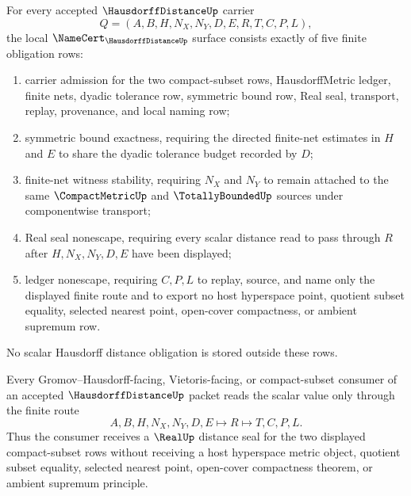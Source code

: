 \begin{theorem}
\label{thm:hausdorff-distance-namecert-obligations}
For every accepted $\HausdorffDistanceUp$ carrier
$$
Q=(A,B,H,N_X,N_Y,D,E,R,T,C,P,L),
$$
the local $\NameCert_{\HausdorffDistanceUp}$ surface consists exactly of five finite obligation rows:
\begin{enumerate}
\item carrier admission for the two compact-subset rows, HausdorffMetric ledger, finite nets, dyadic tolerance row, symmetric bound row, Real seal, transport, replay, provenance, and local naming row;
\item symmetric bound exactness, requiring the directed finite-net estimates in $H$ and $E$ to share the dyadic tolerance budget recorded by $D$;
\item finite-net witness stability, requiring $N_X$ and $N_Y$ to remain attached to the same $\CompactMetricUp$ and $\TotallyBoundedUp$ sources under componentwise transport;
\item Real seal nonescape, requiring every scalar distance read to pass through $R$ after $H,N_X,N_Y,D,E$ have been displayed;
\item ledger nonescape, requiring $C,P,L$ to replay, source, and name only the displayed finite route and to export no host hyperspace point, quotient subset equality, selected nearest point, open-cover compactness, or ambient supremum row.
\end{enumerate}
No scalar Hausdorff distance obligation is stored outside these rows.
\end{theorem}

\begin{theorem}
\label{thm:hausdorff-distance-scalar-handoff}
Every Gromov--Hausdorff-facing, Vietoris-facing, or compact-subset consumer of an accepted $\HausdorffDistanceUp$ packet reads the scalar value only through the finite route
$$
A,B,H,N_X,N_Y,D,E \longmapsto R \longmapsto T,C,P,L .
$$
Thus the consumer receives a $\RealUp$ distance seal for the two displayed compact-subset rows without receiving a host hyperspace metric object, quotient subset equality, selected nearest point, open-cover compactness theorem, or ambient supremum principle.
\end{theorem}


